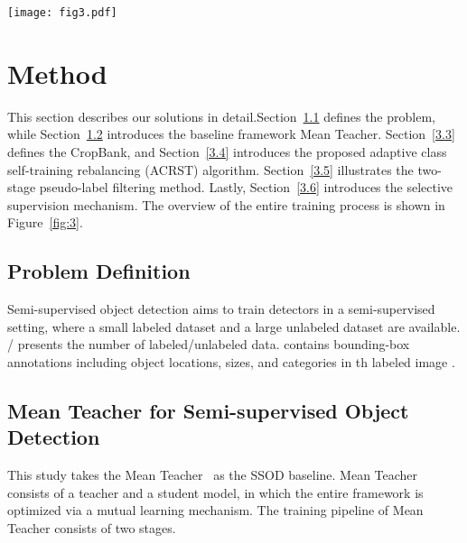 \begin{figure*}
\texttt{[image: fig3.pdf]}
\caption{\textbf{Overview of our methods}. We take Mean Teacher as our SSOD baseline. In Mean Teacher, the teacher model generates pseudo labels from weakly augmented unlabeled data, and the student model is trained with a combination of ground-truths and pseudo labels. To alleviate the class imbalance in SSOD, we first design a memory module called CropBank which absorbs instance-level annotations including ground truths and pseudo labels. Thereafter, we utilize the CropBank to perform foreground-background rebalancing (FBR) and adaptive foreground-foreground rebalancing (AFFR) on strong augmented unlabeled data for adaptive class-rebalancing self-training (ACRST). To further improve ACRST, we introduce a two-stage pseudo-label filtering algorithm with classification confidence and high-level semantics.}
\label{fig:3}
\end{figure*}

\section{Method}
This section describes our solutions in detail.Section~\ref{3.1} defines the problem, while Section~\ref{3.2} introduces the baseline framework Mean Teacher. Section~\ref{3.3} defines the CropBank, and Section~\ref{3.4} introduces the proposed adaptive class self-training rebalancing (ACRST) algorithm. Section~\ref{3.5} illustrates the two-stage pseudo-label filtering method. Lastly, Section~\ref{3.6} introduces the selective supervision mechanism. The overview of the entire training process is shown in Figure~\ref{fig:3}.

\subsection{Problem Definition}\label{3.1}
Semi-supervised object detection aims to train detectors in a semi-supervised setting, where a small labeled dataset  and a large unlabeled dataset  are available. / presents the number of labeled/unlabeled data. contains bounding-box annotations including object locations, sizes, and categories in th labeled image . 

\subsection{Mean Teacher for Semi-supervised Object Detection}\label{3.2}
    This study takes the Mean Teacher~\cite{tarvainen2018mean} as the SSOD baseline. Mean Teacher consists of a teacher and a student model, in which the entire framework is optimized via a mutual learning mechanism. The training pipeline of Mean Teacher consists of two stages. 
    
